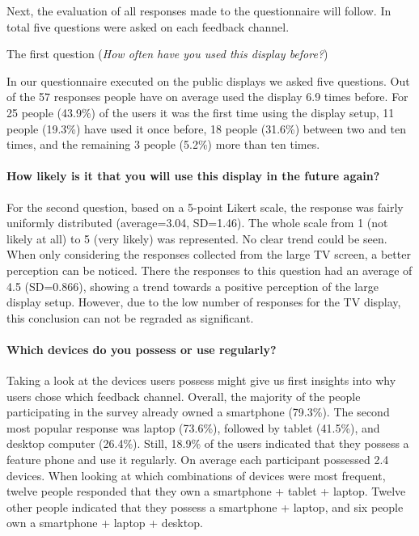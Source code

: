 	Next, the evaluation of all responses made to the questionnaire will follow. In total five questions were asked on each feedback channel.  



	The first question (\textit{How often have you used this display before?})


	In our questionnaire executed on the public displays we asked five questions. Out of the 57 responses people have on average used the display 6.9 times before. For 25 people (43.9\%) of the users it was the first time using the display setup, 11 people (19.3\%) have used it once before, 18 people (31.6\%) between two and ten times, and the remaining 3 people (5.2\%) more than ten times.

	\paragraph{How likely is it that you will use this display in the future again?}
	For the second question, based on a 5-point Likert scale, the response was fairly uniformly distributed (average=3.04, SD=1.46). The whole scale from 1 (not likely at all) to 5 (very likely) was represented. No clear trend could be seen. When only considering the responses collected from the large TV screen, a better perception can be noticed. There the responses to this question had an average of 4.5 (SD=0.866), showing a trend towards a positive perception of the large display setup. However, due to the low number of responses for the TV display, this conclusion can not be regraded as significant. 

	\paragraph{Which devices do you possess or use regularly?}
	Taking a look at the devices users possess might give us first insights into why users chose which feedback channel. Overall, the majority of the people participating in the survey already owned a smartphone (79.3\%). The second most popular response was laptop (73.6\%), followed by tablet (41.5\%), and desktop computer (26.4\%). Still, 18.9\% of the users indicated that they possess a feature phone and use it regularly. On average each participant possessed 2.4 devices. 
	When looking at which combinations of devices were most frequent, twelve people responded that they own a smartphone + tablet + laptop. Twelve other people indicated that they possess a smartphone + laptop, and six people own a smartphone + laptop + desktop.

